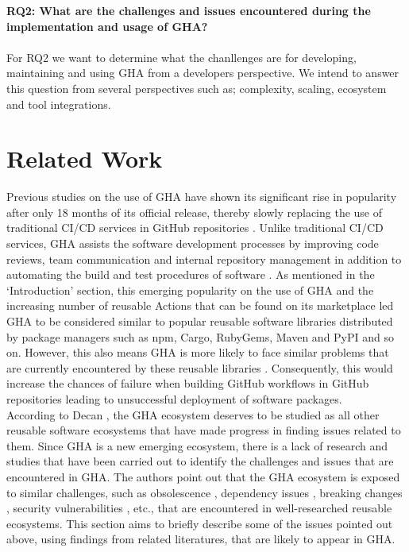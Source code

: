 \documentclass[conference]{IEEEtran}
\begin{document}
     \textbf{RQ2: What are the challenges and issues encountered during the implementation and usage of GHA?}\\\\
        For RQ2 we want to determine what the chanllenges are for developing, maintaining and using GHA from a developers perspective. We intend to answer this question from several perspectives such as; complexity, scaling, ecosystem and tool integrations.




\section{Related Work}
    Previous studies on the use of GHA have shown its significant rise in popularity after only 18 months of its official release, thereby slowly replacing the use of traditional CI/CD services in GitHub repositories \cite{golzadeh2021rise}. Unlike traditional CI/CD services, GHA assists the software development processes by improving code reviews, team communication and internal repository management in addition to automating the build and test procedures of software \cite{chandrasekara2021hands}. As mentioned in the ‘Introduction’ section, this emerging popularity on the use of GHA and the increasing number of reusable Actions that can be found on its marketplace led GHA to be considered similar to popular reusable software libraries distributed by package managers such as npm, Cargo, RubyGems, Maven and PyPI and so on. However, this also means GHA is more likely to face similar problems that are currently encountered by these reusable libraries \cite{decan2022use}. Consequently, this would increase the chances of failure when building GitHub workflows in GitHub repositories leading to unsuccessful deployment of software packages. \\

    According to Decan \cite{decan2022use}, the GHA ecosystem deserves to be studied as all other reusable software ecosystems that have made progress in finding issues related to them. Since GHA is a new emerging ecosystem, there is a lack of research and studies that have been carried out to identify the challenges and issues that are encountered in GHA. The authors point out that the GHA ecosystem is exposed to similar challenges, such as obsolescence \cite{decan2018evolution} \cite{cogo2021deprecation}, dependency issues \cite{decan2019empirical} \cite{soto2021comprehensive} \cite{decan2019package}, breaking changes \cite{dietrich2019dependency}\cite{decan2018impact}, security vulnerabilities \cite{zimmermann2019small} \cite{kula2018developers}, etc., that are encountered in well-researched reusable ecosystems. This section aims to briefly describe some of the issues pointed out above, using findings from related literatures, that are likely to appear in GHA.
\end{document}

